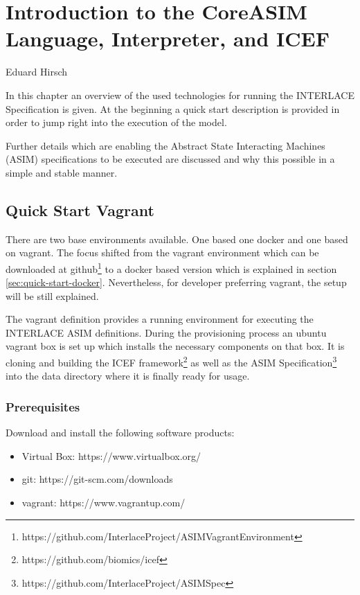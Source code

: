\chapter{Introduction to the CoreASIM Language, Interpreter, and ICEF}
\label{ch:CoreAsimIntro}

\vspace{-1cm}
\begin{center}
Eduard Hirsch
\end{center}

In this chapter an overview of the used technologies for running the INTERLACE Specification is given. At the beginning a quick start description is provided in order to jump right into the execution of the model.

Further details which are enabling the Abstract State Interacting Machines (ASIM) specifications to be executed are discussed and why this possible in a simple and stable manner.

\section{Quick Start Vagrant}
\label{sec:quick-start-vagrant}

There are two base environments available. One based one docker and one based on vagrant. The focus shifted from the vagrant environment which can be downloaded at github\footnote{https://github.com/InterlaceProject/ASIMVagrantEnvironment} to a docker based version which is explained in section \ref{sec:quick-start-docker}. Nevertheless, for developer preferring vagrant, the setup will be still explained.

The vagrant definition provides a running environment for executing the INTERLACE ASIM definitions. During the provisioning process an ubuntu vagrant box is set up which installs the necessary components on that box. It is cloning and building the ICEF framework\footnote{https://github.com/biomics/icef} as well as the ASIM Specification\footnote{https://github.com/InterlaceProject/ASIMSpec} into the data directory where it is finally ready for usage.

\subsection{Prerequisites}

Download and install the following software products:

\begin{itemize}
	\item Virtual Box: https://www.virtualbox.org/
	\item git: https://git-scm.com/downloads
	\item vagrant: https://www.vagrantup.com/
\end{itemize}

